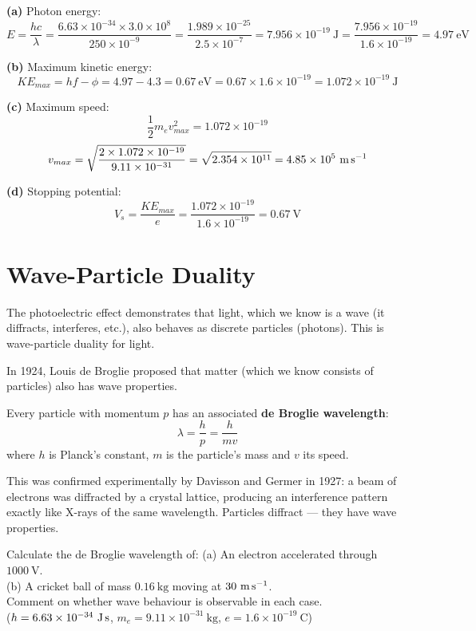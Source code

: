 \begin{solutionbox}
\textbf{(a)} Photon energy:
\[
  E = \frac{hc}{\lambda}
  = \frac{6.63\times10^{-34} \times 3.0\times10^8}
    {250\times10^{-9}}
  = \frac{1.989\times10^{-25}}{2.5\times10^{-7}}
  = 7.956\times10^{-19}\ \text{J}
  = \frac{7.956\times10^{-19}}{1.6\times10^{-19}}
  = 4.97\ \text{eV}
\]

\textbf{(b)} Maximum kinetic energy:
\[
  KE_{max} = hf - \phi = 4.97 - 4.3
  = 0.67\ \text{eV}
  = 0.67 \times 1.6\times10^{-19}
  = 1.072\times10^{-19}\ \text{J}
\]

\textbf{(c)} Maximum speed:
\[
  \frac{1}{2}m_e v_{max}^2 = 1.072\times10^{-19}
\]
\[
  v_{max} = \sqrt{\frac{2 \times 1.072\times10^{-19}}
    {9.11\times10^{-31}}}
  = \sqrt{2.354\times10^{11}}
  = 4.85\times10^5\ \text{m\,s}^{-1}
\]

\textbf{(d)} Stopping potential:
\[
  V_s = \frac{KE_{max}}{e}
  = \frac{1.072\times10^{-19}}{1.6\times10^{-19}}
  = 0.67\ \text{V}
\]
\end{solutionbox}

\section{Wave-Particle Duality}

The photoelectric effect demonstrates that light,
which we know is a wave (it diffracts, interferes,
etc.), also behaves as discrete particles (photons).
This is wave-particle duality for light.

In 1924, Louis de Broglie proposed that matter
(which we know consists of particles) also has
wave properties.

\begin{lawbox}
Every particle with momentum $p$ has an associated
\textbf{de Broglie wavelength}:
\[
  \lambda = \frac{h}{p} = \frac{h}{mv}
\]
where $h$ is Planck's constant, $m$ is the particle's
mass and $v$ its speed.

This was confirmed experimentally by Davisson and
Germer in 1927: a beam of electrons was diffracted
by a crystal lattice, producing an interference
pattern exactly like X-rays of the same wavelength.
Particles diffract --- they have wave properties.
\end{lawbox}

\begin{examplebox}[27.3]
Calculate the de Broglie wavelength of:
(a) An electron accelerated through $1000\ \text{V}$.\\
(b) A cricket ball of mass $0.16\ \text{kg}$ moving
at $30\ \text{m\,s}^{-1}$.\\
Comment on whether wave behaviour is observable
in each case.\\
($h = 6.63\times10^{-34}\ \text{J\,s}$,
$m_e = 9.11\times10^{-31}\ \text{kg}$,
$e = 1.6\times10^{-19}\ \text{C}$)
\end{examplebox}

